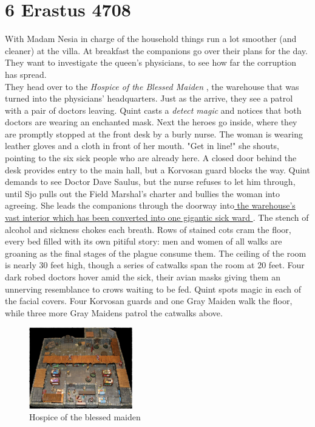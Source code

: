 \section{6 Erastus 4708}

With Madam Nesia in charge of the household things run a lot smoother (and cleaner) at the villa. At breakfast the companions go over their plans for the day. They want to investigate the queen's physicians, to see how far the corruption has spread.\\

They head over to the {\itshape Hospice of the Blessed Maiden} , the warehouse that was turned into the physicians' headquarters. Just as the arrive, they see a patrol with a pair of doctors leaving. Quint casts a  {\itshape detect magic} and notices that both doctors are wearing an enchanted mask. Next the heroes go inside, where they are promptly stopped at the front desk by a burly nurse. The woman is wearing leather gloves and a cloth in front of her mouth. "Get in line!" she shouts, pointing to the six sick people who are already here. A closed door behind the desk provides entry to the main hall, but a Korvosan guard blocks the way. Quint demands to see Doctor Dave Saulus, but the nurse refuses to let him through, until Sjo pulls out the Field Marshal's charter and bullies the woman into agreeing. She leads the companions through the doorway into\hyperref[fig:Hospice-of-the-blessed-maiden-515716825]{ the warehouse's vast interior which has been converted into one gigantic sick ward } . The stench of alcohol and sickness chokes each breath. Rows of stained cots cram the floor, every bed filled with its own pitiful story: men and women of all walks are groaning as the final stages of the plague consume them. The ceiling of the room is nearly 30 feet high, though a series of catwalks span the room at 20 feet. Four dark robed doctors hover amid the sick, their avian masks giving them an unnerving resemblance to crows waiting to be fed. Quint spots magic in each of the facial covers. Four Korvosan guards and one Gray Maiden walk the floor, while three more Gray Maidens patrol the catwalks above. \\

\begin{figure}[h]
	\centering
	\includegraphics[width=0.4\textwidth]{images/Hospice-of-the-blessed-maiden-515716825_mod.jpg}
	\caption{Hospice of the blessed maiden}
	\label{fig:Hospice-of-the-blessed-maiden-515716825}
\end{figure}

